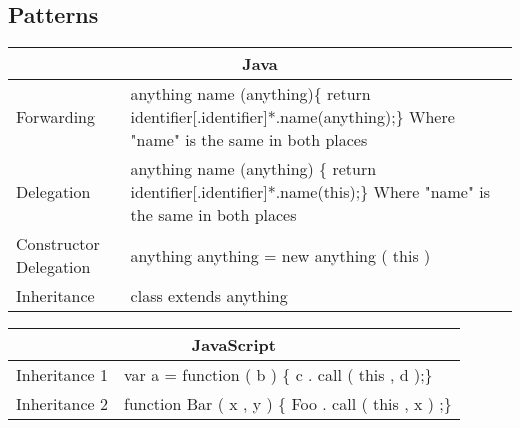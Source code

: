 \subsection{Patterns}
\begin{table}[]
	\centering
	\label{my-label}
	\begin{tabular}{|p{5cm}|p{9cm}|}
		\hline
		\multicolumn{2}{|c|}{Java}                                                                                                                                               \\ \hline
		Forwarding                     & anything name (anything)\{ \newline   return identifier{[}.identifier{]}*.name(anything);\newline \} \newline Where "name" is the same in both places \\ \hline
		Delegation                     & anything name (anything) \{ \newline   return identifier{[}.identifier{]}*.name(this);\newline \}  \newline Where "name" is the same in both places                    \\ \hline
		Constructor Delegation & anything anything = new anything ( this )                                                                                                  \\ \hline
		Inheritance                    & class extends anything                                                                                                                                         \\ \hline
	\end{tabular}
\end{table}\begin{table}[]
\centering
\label{my-label}
\begin{tabular}{|p{5cm}|p{9cm}|}
	\hline
	\multicolumn{2}{|c|}{JavaScript}                                                                                                                                                                  \\ \hline
	Inheritance 1                  & var a = function ( b ) \{    c . call ( this , d );\}                                                                                      \\ \hline
	Inheritance 2                  & function Bar   ( x , y ) \{    Foo . call ( this , x ) ;\}                                                                                 \\ \hline

\end{tabular}
\end{table}
